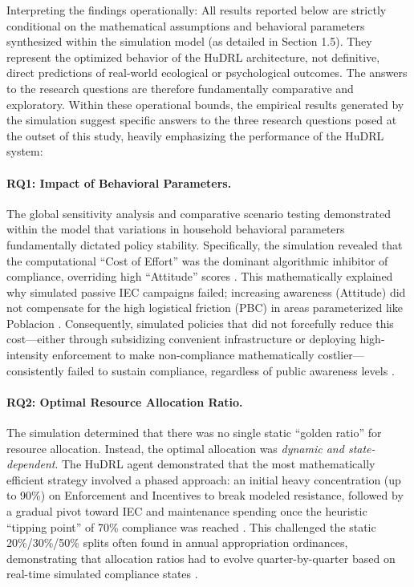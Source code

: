 Interpreting the findings operationally: All results reported below are strictly conditional on the mathematical assumptions and behavioral parameters synthesized within the simulation model (as detailed in Section 1.5). They represent the optimized behavior of the HuDRL architecture, not definitive, direct predictions of real-world ecological or psychological outcomes. The answers to the research questions are therefore fundamentally comparative and exploratory. Within these operational bounds, the empirical results generated by the simulation suggest specific answers to the three research questions posed at the outset of this study, heavily emphasizing the performance of the HuDRL system:

\paragraph{RQ1: Impact of Behavioral Parameters.}

The global sensitivity analysis and comparative scenario testing demonstrated within the model that variations in household behavioral parameters fundamentally dictated policy stability. Specifically, the simulation revealed that the computational ``Cost of Effort'' was the dominant algorithmic inhibitor of compliance, overriding high ``Attitude'' scores \citep{Zheng2022}. This mathematically explained why simulated passive IEC campaigns failed; increasing awareness (Attitude) did not compensate for the high logistical friction (PBC) in areas parameterized like Poblacion \citep{Moeini2023}. Consequently, simulated policies that did not forcefully reduce this cost—either through subsidizing convenient infrastructure or deploying high-intensity enforcement to make non-compliance mathematically costlier—consistently failed to sustain compliance, regardless of public awareness levels \citep{Chen2023, Badua2022}.

\paragraph{RQ2: Optimal Resource Allocation Ratio.}

The simulation determined that there was no single static ``golden ratio'' for resource allocation. Instead, the optimal allocation was \textit{dynamic and state-dependent}. The HuDRL agent demonstrated that the most mathematically efficient strategy involved a phased approach: an initial heavy concentration (up to 90\%) on Enforcement and Incentives to break modeled resistance, followed by a gradual pivot toward IEC and maintenance spending once the heuristic ``tipping point'' of 70\% compliance was reached \citep{Nishimura2022}. This challenged the static 20\%/30\%/50\% splits often found in annual appropriation ordinances, demonstrating that allocation ratios had to evolve quarter-by-quarter based on real-time simulated compliance states \citep{Abdallah2021, Torkayesh2021}.

